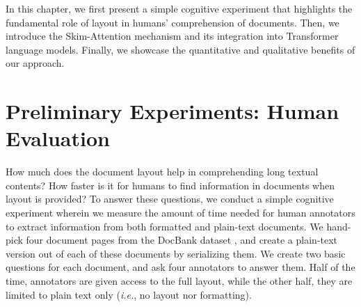 In this chapter, we first present a simple cognitive experiment that highlights the fundamental role of layout in humans' comprehension of documents. Then, we introduce the Skim-Attention mechanism and its integration into Transformer language models. Finally, we showcase the quantitative and qualitative benefits of our approach.


\section{Preliminary Experiments: Human Evaluation}
\label{section:human-evaluation}

How much does the document layout help in comprehending long textual contents? How faster is it for humans to find information in documents when layout is provided? To answer these questions, we conduct a simple cognitive experiment wherein we measure the amount of time needed for human annotators to extract information from both formatted and plain-text documents. We hand-pick four document pages from the DocBank dataset \citep{li2020docbank}, and create a plain-text version out of each of these documents by serializing them. We create two basic questions for each document, and ask four annotators to answer them. Half of the time, annotators are given access to the full layout, while the other half, they are limited to plain text only (\textit{i.e.}, no layout nor formatting).

